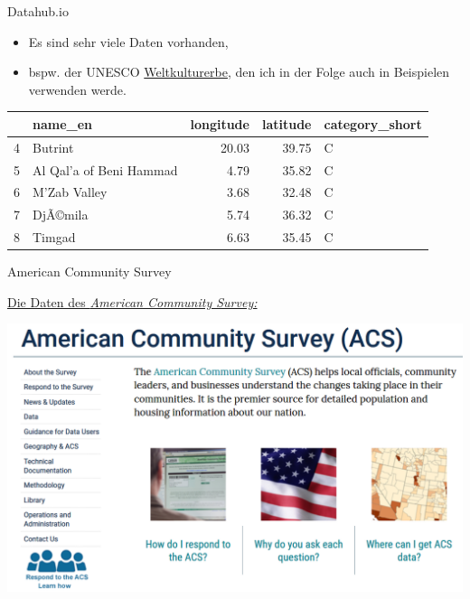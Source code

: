 \documentclass[ignorenonframetext,]{beamer}
\providecommand{\tightlist}{%
  \setlength{\itemsep}{0pt}\setlength{\parskip}{0pt}}
\begin{document}
\begin{frame}{Datahub.io}
\protect\hypertarget{datahub.io}{}

\begin{itemize}
\tightlist
\item
  Es sind sehr viele Daten vorhanden,
\item
  bspw. der UNESCO
  \href{http://datahub.io/dataset/unesco-world-heritage-sites/resource/d4116195-44d8-4bc1-9f91-9b570870dc19}{Weltkulturerbe},
  den ich in der Folge auch in Beispielen verwenden werde.
\end{itemize}

\begin{longtable}[]{@{}llrrl@{}}
\toprule
& name\_en & longitude & latitude & category\_short\tabularnewline
\midrule
\endhead
4 & Butrint & 20.03 & 39.75 & C\tabularnewline
5 & Al Qal'a of Beni Hammad & 4.79 & 35.82 & C\tabularnewline
6 & M'Zab Valley & 3.68 & 32.48 & C\tabularnewline
7 & DjÃ©mila & 5.74 & 36.32 & C\tabularnewline
8 & Timgad & 6.63 & 35.45 & C\tabularnewline
\bottomrule
\end{longtable}

\end{frame}

\begin{frame}{American Community Survey}
\protect\hypertarget{american-community-survey}{}

\begin{block}{\href{http://www.census.gov/acs/www/}{Die Daten des
\emph{American Community Survey:}}}

\includegraphics{figure/ACS.PNG}

\end{block}

\end{frame}
\end{document}
